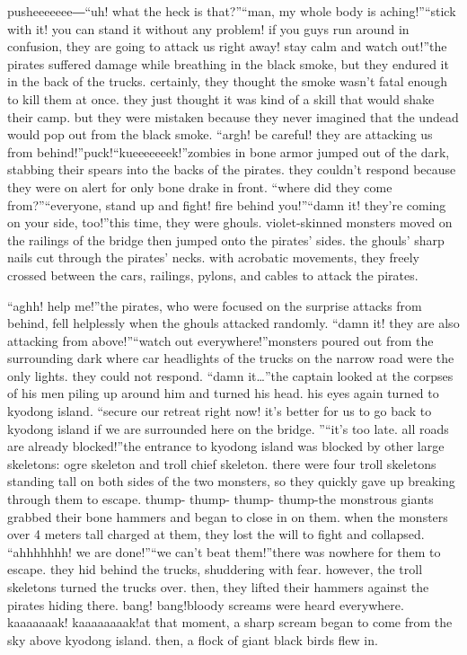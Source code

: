 pusheeeeeee―“uh! what the heck is that?”“man, my whole body is aching!”“stick with it! you can stand it without any problem! if you guys run around in confusion, they are going to attack us right away! stay calm and watch out!”the pirates suffered damage while breathing in the black smoke, but they endured it in the back of the trucks.
certainly, they thought the smoke wasn’t fatal enough to kill them at once.
 they just thought it was kind of a skill that would shake their camp.
but they were mistaken because they never imagined that the undead would pop out from the black smoke.
“argh! be careful! they are attacking us from behind!”puck!“kueeeeeeek!”zombies in bone armor jumped out of the dark, stabbing their spears into the backs of the pirates.
they couldn’t respond because they were on alert for only bone drake in front.
“where did they come from?”“everyone, stand up and fight! fire behind you!”“damn it! they’re coming on your side, too!”this time, they were ghouls.
 violet-skinned monsters moved on the railings of the bridge then jumped onto the pirates’ sides.
the ghouls’ sharp nails cut through the pirates’ necks.
 with acrobatic movements, they freely crossed between the cars, railings, pylons, and cables to attack the pirates.


“aghh! help me!”the pirates, who were focused on the surprise attacks from behind, fell helplessly when the ghouls attacked randomly.
“damn it! they are also attacking from above!”“watch out everywhere!”monsters poured out from the surrounding dark where car headlights of the trucks on the narrow road were the only lights.
 they could not respond.
“damn it…”the captain looked at the corpses of his men piling up around him and turned his head.
his eyes again turned to kyodong island.
“secure our retreat right now! it’s better for us to go back to kyodong island if we are surrounded here on the bridge.
”“it’s too late.
 all roads are already blocked!”the entrance to kyodong island was blocked by other large skeletons: ogre skeleton and troll chief skeleton.
there were four troll skeletons standing tall on both sides of the two monsters, so they quickly gave up breaking through them to escape.
thump- thump- thump- thump-the monstrous giants grabbed their bone hammers and began to close in on them.
 when the monsters over 4 meters tall charged at them, they lost the will to fight and collapsed.
“ahhhhhhh! we are done!”“we can’t beat them!”there was nowhere for them to escape.
 they hid behind the trucks, shuddering with fear.
however, the troll skeletons turned the trucks over.
 then, they lifted their hammers against the pirates hiding there.
bang! bang!bloody screams were heard everywhere.
kaaaaaaak! kaaaaaaaak!at that moment, a sharp scream began to come from the sky above kyodong island.
then, a flock of giant black birds flew in.


 